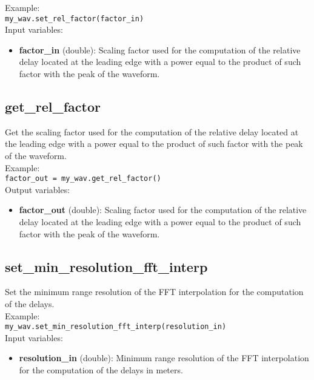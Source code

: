 Example:\\

\texttt{my\_wav.set\_rel\_factor(factor\_in)}\\

Input variables:
\begin{itemize}
\item {\bf factor\_in} (double): Scaling factor used for the computation of the relative delay located at the leading edge with a power equal to the product of such factor with the peak of the waveform.
\end{itemize}


\subsection{get\_rel\_factor}

Get the scaling factor used for the computation of the relative delay located at the leading edge with a power equal to the product of such factor with the peak of the waveform.\\

Example:\\

\texttt{factor\_out = my\_wav.get\_rel\_factor()}\\

Output variables:
\begin{itemize}
\item {\bf factor\_out} (double): Scaling factor used for the computation of the relative delay located at the leading edge with a power equal to the product of such factor with the peak of the waveform.
\end{itemize}


\subsection{set\_min\_resolution\_fft\_interp}

Set the minimum range resolution of the FFT interpolation for the computation of the delays.\\

Example:\\

\texttt{my\_wav.set\_min\_resolution\_fft\_interp(resolution\_in)}\\

Input variables:
\begin{itemize}
\item {\bf resolution\_in} (double): Minimum range resolution of the FFT interpolation for the computation of the delays in meters.
\end{itemize}


